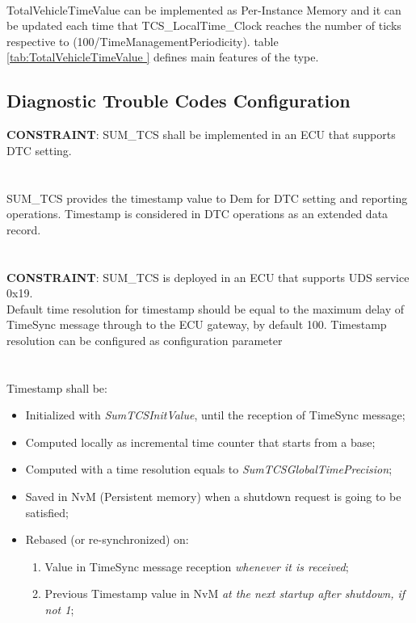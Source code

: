 \\
TotalVehicleTimeValue  can be implemented as Per-Instance Memory and it can be updated each time that TCS_LocalTime_Clock reaches the number of ticks respective to (100/TimeManagementPeriodicity).
table \ref{tab:TotalVehicleTimeValue } defines main features of the type.
\\
{}

\subsection{Diagnostic Trouble Codes Configuration}
\label{sec:dtc-timestamp}

\textbf{CONSTRAINT}: SUM\_TCS shall be implemented in an ECU that supports DTC setting.
\\
\\
\\
SUM\_TCS provides the timestamp value to Dem for DTC setting and reporting operations. Timestamp is considered in DTC operations as an extended data record.
\\
{}
\\
\\
\textbf{CONSTRAINT}: SUM\_TCS is deployed in an ECU that supports UDS service 0x19.
\\
{
\label{paragraph:default-resolution}
Default time resolution for timestamp should be equal to the maximum delay of TimeSync message through to the ECU gateway, by default 100. Timestamp resolution can be configured as
configuration parameter
}
\\
\\
\\
Timestamp shall be:
\begin{itemize}
	\item Initialized with \textit{SumTCSInitValue}, until the reception of TimeSync message;
	\item Computed locally as incremental time counter that starts from a base;
	\item Computed with a time resolution equals to \textit{SumTCSGlobalTimePrecision};
	\item Saved in NvM (Persistent memory) when a shutdown request is going to be satisfied;
	\item Rebased (or re-synchronized) on:
	\begin{enumerate}
		\item Value in TimeSync message reception \textit{whenever it is received};
		\item Previous Timestamp value in NvM \textit{at the next startup after shutdown, if not 1};
	\end{enumerate}
\end{itemize}
{ }

